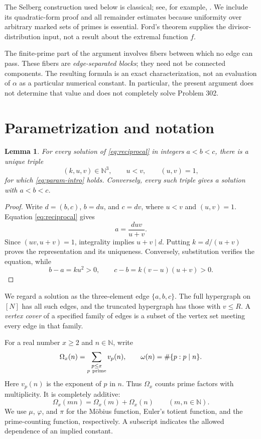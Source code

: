 \documentclass[11pt]{article}
\newtheorem{lemma}[theorem]{Lemma}
\theoremstyle{definition}
\theoremstyle{remark}
\numberwithin{equation}{section}
\newcommand{\N}{\mathbb N}
\begin{document}
The Selberg construction used below is classical; see, for example,
\cite{HR}. We include its quadratic-form proof and all remainder
estimates because uniformity over arbitrary marked sets of primes
is essential. Ford's theorem supplies the divisor-distribution
input, not a result about the extremal function \(f\).

The finite-prime part of the argument involves fibers between which
no edge can pass. These fibers are \emph{edge-separated blocks};
they need not be connected components. The resulting formula is an
exact characterization, not an evaluation of \(\alpha\) as a
particular numerical constant. In particular, the present argument
does not determine that value and does not completely solve Problem 302.

\section{Parametrization and notation}

\begin{lemma}\label{lem:param}
For every solution of \eqref{eq:reciprocal} in integers
\(a<b<c\), there is a unique triple
\[
 (k,u,v)\in\N^3,\qquad u<v,\qquad (u,v)=1,
\]
for which \eqref{eq:param-intro} holds. Conversely, every such
triple gives a solution with \(a<b<c\).
\end{lemma}

\begin{proof}
Write \(d=(b,c)\), \(b=du\), and \(c=dv\), where \(u<v\) and
\((u,v)=1\). Equation \eqref{eq:reciprocal} gives
\[
 a=\frac{duv}{u+v}.
\]
Since \((uv,u+v)=1\), integrality implies \(u+v\mid d\).
Putting \(k=d/(u+v)\) proves the representation and its uniqueness.
Conversely, substitution verifies the equation, while
\[
 b-a=ku^2>0,\qquad c-b=k(v-u)(u+v)>0.
\]
\end{proof}

We regard a solution as the three-element edge \(\{a,b,c\}\).
The full hypergraph on \([N]\) has all such edges, and the truncated
hypergraph has those with \(v\le R\). A \emph{vertex cover} of a
specified family of edges is a subset of the vertex set meeting
every edge in that family.

For a real number \(x\ge2\) and \(n\in\N\), write
\[
 \Omega_x(n)=\sum_{\substack{p\le x\\p\ {\rm prime}}}v_p(n),
 \qquad
 \omega(n)=\#\{p:p\mid n\}.
\]
Here \(v_p(n)\) is the exponent of \(p\) in \(n\). Thus
\(\Omega_x\) counts prime factors with multiplicity. It is
completely additive:
\[
 \Omega_x(mn)=\Omega_x(m)+\Omega_x(n)
 \qquad(m,n\in\N).
\]
We use \(\mu\), \(\varphi\), and \(\pi\) for the M\"obius function,
Euler's totient function, and the prime-counting function,
respectively. A subscript indicates the allowed dependence of an
implied constant.
\end{document}
